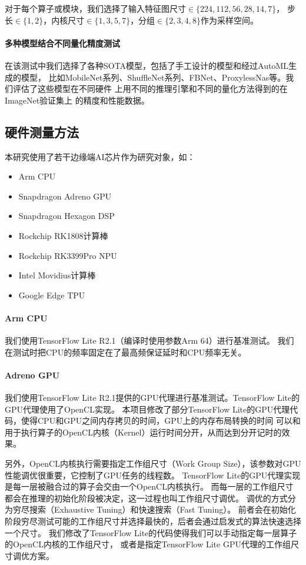 对于每个算子或模块，我们选择了输入特征图尺寸$\in \{224,112,56,28,14,7\}$，
步长$\in \{1,2\}$，内核尺寸$\in \{1,3,5,7\}$，分组$\in \{2,3,4,8\}$作为采样空间。

\paragraph{多种模型结合不同量化精度测试}
在该测试中我们选择了各种SOTA模型，包括了手工设计的模型和经过AutoML生成的模型，
比如MobileNet系列、ShuffleNet系列、FBNet、ProxylessNas等。我们评估了这些模型在不同硬件
上用不同的推理引擎和不同的量化方法得到的在ImageNet\cite{deng2009imagenet}验证集上
的精度和性能数据。

\subsection{硬件测量方法}
本研究使用了若干边缘端AI芯片作为研究对象，如：
\begin{itemize}
    \item Arm CPU
    \item Snapdragon Adreno GPU
    \item Snapdragon Hexagon DSP
    \item Rockchip RK1808计算棒
    \item Rockchip RK3399Pro NPU
    \item Intel Movidius计算棒
    \item Google Edge TPU
\end{itemize}

\paragraph{Arm CPU}
我们使用TensorFlow Lite R2.1（编译时使用参数Arm 64）进行基准测试。
我们在测试时把CPU的频率固定在了最高频保证延时和CPU频率无关。

\paragraph{Adreno GPU}
我们使用TensorFlow Lite R2.1提供的GPU代理进行基准测试。TensorFlow Lite的GPU代理使用了OpenCL实现。
本项目修改了部分TensorFlow Lite的GPU代理代码，使得CPU和GPU之间内存拷贝的时间，GPU上的内存布局转换的时间
可以和用于执行算子的OpenCL内核（Kernel）运行时间分开，从而达到分开记时的效果。

另外，OpenCL内核执行需要指定工作组尺寸（Work Group Size），该参数对GPU性能调优很重要，它控制了GPU任务的线程数。
TensorFlow Lite的GPU代理实现是每一层被融合过的算子会交由一个OpenCL内核执行。
而每一层的工作组尺寸都会在推理的初始化阶段被决定，这一过程也叫工作组尺寸调优。
调优的方式分为穷尽搜索（Exhaustive Tuning）和快速搜索（Fast Tuning）。
前者会在初始化阶段穷尽测试可能的工作组尺寸并选择最快的，后者会通过启发式的算法快速选择一个尺寸。
我们修改了TensorFlow Lite的代码使得我们可以手动指定每一层算子的OpenCL内核的工作组尺寸，
或者是指定TensorFlow Lite GPU代理的工作组尺寸调优方案。

